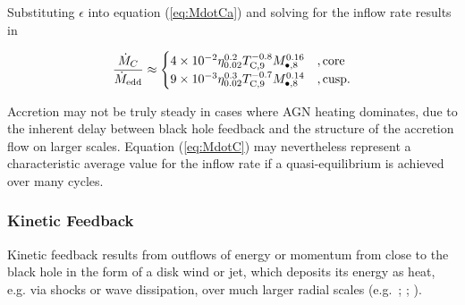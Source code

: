 \documentclass[usenatbib,fleqn]{mn2e}
\begin{document}
Substituting $\epsilon$ into equation (\ref{eq:MdotCa}) and solving
for the inflow rate results in

\begin{align}
\frac{\dot{M}_{C}}{\dot{M}_{\rm edd}} \approx 
\begin{cases} 4\times 10^{-2} \eta_{0.02}^{0.2}T_{\rm
C,9}^{-0.8} M_{\bullet,8}^{0.16}
&, \text{core}\\ 9\times 10^{-3} \eta_{0.02}^{0.3}T_{\rm
C,9}^{-0.7} M_{\bullet,8}^{0.14}
&, \text{cusp}.
  \end{cases}
  \label{eq:MdotC}
\end{align}

Accretion may not be truly steady in cases where AGN heating
dominates, due to the inherent delay between black hole feedback and
the structure of the accretion flow on larger scales.  Equation
(\ref{eq:MdotC}) may nevertheless represent a characteristic average
value for the inflow rate if a quasi-equilibrium is achieved over
many cycles.


\subsubsection{Kinetic Feedback}

Kinetic feedback results from outflows of energy or momentum from
close to the black hole in the form of a disk wind or jet, which
deposits its energy as heat, e.g. via shocks or wave dissipation, over
much larger radial scales (e.g.~\citealt{McNamara&Nulsen07};
\citealt{Novak+11}; \citealt{Gaspari+12}).
\end{document}

